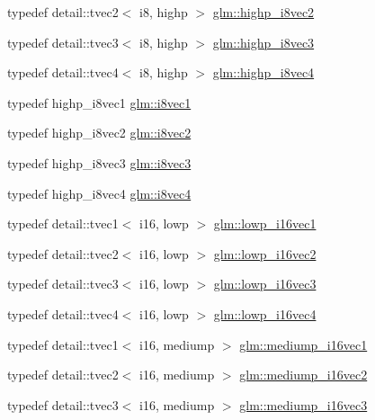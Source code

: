 \begin{DoxyCompactItemize}
\item 
typedef detail\+::tvec2$<$ i8, highp $>$ \hyperlink{group__gtc__type__precision_ga2224945795a870e41d951f0847d54f02}{glm\+::highp\+\_\+i8vec2}
\item 
typedef detail\+::tvec3$<$ i8, highp $>$ \hyperlink{group__gtc__type__precision_gad716792169ce7de963df25b865714438}{glm\+::highp\+\_\+i8vec3}
\item 
typedef detail\+::tvec4$<$ i8, highp $>$ \hyperlink{group__gtc__type__precision_ga283b2f580a4bd7207d27418ef4a1068b}{glm\+::highp\+\_\+i8vec4}
\item 
typedef highp\+\_\+i8vec1 \hyperlink{group__gtc__type__precision_gae67d2e1e7ebd1a79176cac554395b881}{glm\+::i8vec1}
\item 
typedef highp\+\_\+i8vec2 \hyperlink{group__gtc__type__precision_gafd7bbd3878c298014276975f999a8677}{glm\+::i8vec2}
\item 
typedef highp\+\_\+i8vec3 \hyperlink{group__gtc__type__precision_gae1e3127c58fbf1b6fbf28885cfd3dfad}{glm\+::i8vec3}
\item 
typedef highp\+\_\+i8vec4 \hyperlink{group__gtc__type__precision_ga89bb5e6481ae11fb2599b71e36a390bb}{glm\+::i8vec4}
\item 
typedef detail\+::tvec1$<$ i16, lowp $>$ \hyperlink{group__gtc__type__precision_ga6f1e42c07424a2f14faf731c74ba2153}{glm\+::lowp\+\_\+i16vec1}
\item 
typedef detail\+::tvec2$<$ i16, lowp $>$ \hyperlink{group__gtc__type__precision_ga47c5d4c919266799ecc76d832356feff}{glm\+::lowp\+\_\+i16vec2}
\item 
typedef detail\+::tvec3$<$ i16, lowp $>$ \hyperlink{group__gtc__type__precision_ga5b71f24a26316aa21f3c58d25c8db9a8}{glm\+::lowp\+\_\+i16vec3}
\item 
typedef detail\+::tvec4$<$ i16, lowp $>$ \hyperlink{group__gtc__type__precision_ga59ea63973187e1e990fb6633d1800c6d}{glm\+::lowp\+\_\+i16vec4}
\item 
typedef detail\+::tvec1$<$ i16, mediump $>$ \hyperlink{group__gtc__type__precision_ga6a1d37139ea8990de24edf4bfa3500ad}{glm\+::mediump\+\_\+i16vec1}
\item 
typedef detail\+::tvec2$<$ i16, mediump $>$ \hyperlink{group__gtc__type__precision_ga664a0266910df3c2d6559651f94d32e6}{glm\+::mediump\+\_\+i16vec2}
\item 
typedef detail\+::tvec3$<$ i16, mediump $>$ \hyperlink{group__gtc__type__precision_gad9e470f707da812fe454505c99035471}{glm\+::mediump\+\_\+i16vec3}
\item 

\end{DoxyCompactItemize}
